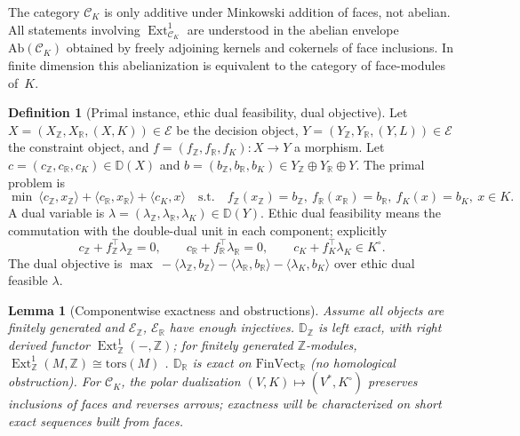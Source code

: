 \documentclass[12pt]{article}
\newcommand{\E}{\mathcal{E}}
\newcommand{\Ext}{\operatorname{Ext}}
\theoremstyle{plain}
\newtheorem{lemma}[theorem]{Lemma}
\theoremstyle{definition}
\newtheorem{definition}[theorem]{Definition}
\theoremstyle{remark}
\numberwithin{equation}{section}
\begin{document}
The category $\mathcal C_K$ is only additive under Minkowski
addition of faces, not abelian.
All statements involving $\Ext^1_{\mathcal C_K}$ are understood
in the abelian envelope
$\mathrm{Ab}(\mathcal C_K)$ obtained by freely adjoining kernels
and cokernels of face inclusions.
In finite dimension this abelianization is equivalent to the
category of face-modules of~$K$.

\begin{definition}[Primal instance, ethic dual feasibility, dual objective]
Let $X=(X_{\mathbb Z},X_{\mathbb R},(X,K))\in\mathcal E$ be the decision object, $Y=(Y_{\mathbb Z},Y_{\mathbb R},(Y,L))\in\mathcal E$ the constraint object, and $f=(f_{\mathbb Z},f_{\mathbb R},f_K):X\to Y$ a morphism. Let $c=(c_{\mathbb Z},c_{\mathbb R},c_K)\in \mathbb D(X)$ and $b=(b_{\mathbb Z},b_{\mathbb R},b_K)\in Y_{\mathbb Z}\oplus Y_{\mathbb R}\oplus Y$. The primal problem is
\[
\min \ \langle c_{\mathbb Z},x_{\mathbb Z}\rangle + \langle c_{\mathbb R},x_{\mathbb R}\rangle + \langle c_K,x\rangle 
\quad \text{s.t.}\quad 
f_{\mathbb Z}(x_{\mathbb Z})=b_{\mathbb Z},\ f_{\mathbb R}(x_{\mathbb R})=b_{\mathbb R},\ f_K(x)=b_K,\ x\in K.
\]
A dual variable is $\lambda=(\lambda_{\mathbb Z},\lambda_{\mathbb R},\lambda_K)\in \mathbb D(Y)$. Ethic dual feasibility means the commutation with the double-dual unit in each component; explicitly
\[
c_{\mathbb Z}+ f_{\mathbb Z}^\top \lambda_{\mathbb Z}=0, \qquad
c_{\mathbb R}+ f_{\mathbb R}^\top \lambda_{\mathbb R}=0, \qquad
c_K+ f_K^\top \lambda_K \in K^\circ.
\]
The dual objective is $\max\ -\langle \lambda_{\mathbb Z},b_{\mathbb Z}\rangle - \langle \lambda_{\mathbb R},b_{\mathbb R}\rangle - \langle \lambda_K,b_K\rangle$ over ethic dual feasible $\lambda$.
\end{definition}

\begin{lemma}[Componentwise exactness and obstructions]\label{lem:componentwise-exactness}
Assume all objects are finitely generated and $\E_{\mathbb Z}$,
$\E_{\mathbb R}$ have enough injectives. $\mathbb D_{\mathbb Z}$ is left exact, with right derived functor $\Ext^1_{\mathbb Z}(-,\mathbb Z)$; for finitely generated $\mathbb Z$-modules, $\Ext^1_{\mathbb Z}(M,\mathbb Z)\cong \mathrm{tors}(M)$ \cite{Weibel1994}. $\mathbb D_{\mathbb R}$ is exact on $\mathrm{FinVect}_{\mathbb R}$ (no homological obstruction). For $\mathcal C_K$, the polar dualization $(V,K)\mapsto (V^*,K^\circ)$ preserves inclusions of faces and reverses arrows; exactness will be characterized on short exact sequences built from faces.
\end{lemma}
\end{document}
